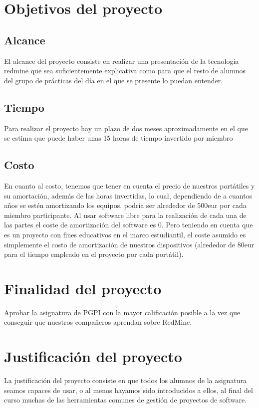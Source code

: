 \documentclass[a4paper,10pt]{scrartcl}
\begin{document}
\section{Objetivos del proyecto}
\subsection{Alcance}
		El alcance del proyecto consiste en realizar una presentación de la tecnología redmine que sea suficientemente explicativa como para que el resto de alumnos del grupo de prácticas del día en el que se presente lo puedan entender.

\subsection{Tiempo}		
		Para realizar el proyecto hay un plazo de dos meses aproximadamente en el que se estima que puede haber unas 15 horas de tiempo invertido por miembro		
		
\subsection{Costo}
		En cuanto al costo, tenemos que tener en cuenta el precio de nuestros portátiles y su amortación, además de las horas invertidas, lo cual, dependiendo de a cuantos años se estén amortizando los equipos, podría ser alrededor de 500eur  por cada miembro participante.
		Al usar software libre para la realización de cada una de las partes el coste de amortización del software es 0.
		Pero teniendo en cuenta que es un proyecto con fines educativos en el marco estudiantil, el coste asumido es simplemente el costo de amortización de nuestros dispositivos (alrededor de 80eur para el tiempo empleado en el proyecto por cada portátil).


\section{Finalidad del proyecto}

	Aprobar la asignatura de PGPI con la mayor calificación posible a la vez que conseguir que nuestros compañeros aprendan sobre RedMine.
	
\section{Justificación del proyecto}

	La justificación del proyecto consiste en que todos los alumnos de la asignatura seamos capaces de usar, o al menos hayamos sido introducidos a ellos, al final del curso muchas de las herramientas comunes de gestión de proyectos de software.
\end{document}
